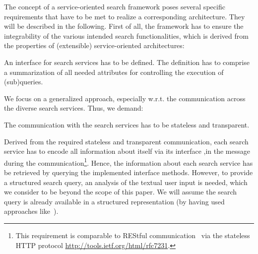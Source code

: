 The concept of a service-oriented search framework poses several specific requirements that have to be met to rea\-lize a corresponding architecture.
They will be described in the following.
First of all, the framework has to ensure the integrability of the various intended search functionalities, which is derived from the properties of (extensible) service-oriented architectures:
\begin{req}
An interface for search services has to be defined. The definition has to comprise a  summarization of all needed attributes for controlling the execution of (sub)queries.
\end{req}

We focus on a generalized approach, especially w.r.t. the communication across the diverse search services. Thus, we demand:
\begin{req}
The communication with the search services has to be stateless and transparent.
\end{req}
Derived from the required stateless and transparent communication, each search service has to encode all information about itself via its interface ,\ie in the message during the communication\footnote{This requirement is comparable to REStful communication~\cite{richardson2008restful} via the stateless HTTP protocol \url{http://tools.ietf.org/html/rfc7231}.}.
Hence, the information about each search service has be retrieved by querying the implemented interface methods.
However, to provide a structured search query, an analysis of the textual user input is needed, which we consider to be beyond the scope of this paper. 
We will assume the search query is already available in a structured representation (\eg by having used approaches like~\cite{similarity,aqualog,tbsl}).

